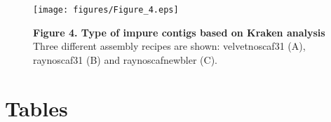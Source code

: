 \begin{figure}
\centering
\texttt{[image: figures/Figure\_4.eps]}
\caption{
{\bf Figure 4. Type of impure contigs based on Kraken analysis}
Three different assembly recipes are shown: velvetnoscaf31 (A), raynoscaf31 (B)
and raynoscafnewbler (C).}
\label{Figure_3}
\end{figure}


\section*{Tables}
% 
%
%
